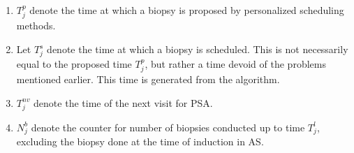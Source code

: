\begin{enumerate}
\item $T^p_j$ denote the time at which a biopsy is proposed by personalized scheduling methods.
\item Let $T^s_j$ denote the time at which a biopsy is scheduled. This is not necessarily equal to the proposed time $T^p_j$, but rather a time devoid of the problems mentioned earlier. This time is generated from the algorithm.
\item $T^{nv}_j$ denote the time of the next visit for PSA.
\item $N^b_j$ denote the counter for number of biopsies conducted up to time $T^l_j$, excluding the biopsy done at the time of induction in AS.
\end{enumerate}

